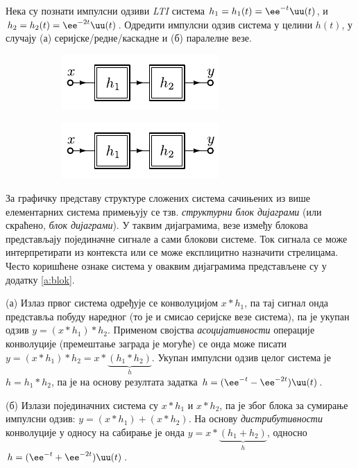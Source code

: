\PID 
Нека су познати импулсни одзиви \textit{LTI} система 
 $h_1 = h_1(t) = \ee^{-t} \uu(t)$, и $h_2 = h_2(t) = \ee^{-2t} \uu(t)$. Одредити 
импулсни одзив система у целини $h(t)$, у случају (а) серијске/редне/каскадне и (б) паралелне везе. 
\begin{figure}[ht!]
    \begin{subfigure}{0.5\textwidth}
        \centering
        \includegraphics[page=1]{fig/ser_par.pdf}
        \caption{}
    \end{subfigure}
    \begin{subfigure}{0.5\textwidth}
        \centering
        \includegraphics[page=2]{fig/ser_par.pdf}
        \caption{}
    \end{subfigure}
    \caption{}
\end{figure}

\RESENJE

За графичку представу структуре сложених система сачињених из више елементарних система примењују се тзв. \textit{структурни блок дијаграми}
(или скраћено, \textit{блок дијаграми}). У таквим дијаграмима, везе између блокова представљају појединачне сигнале а сами блокови системе.
Ток сигнала се може интерпретирати из контекста или се може експлицитно назначити стрелицама. Често коришћене ознаке система у оваквим дијаграмима 
представљене су у додатку \ref{a:blok}.

(а) Излаз првог система одређује се конволуцијом $x \ast h_1$, па тај сигнал онда представља побуду наредног (то је и смисао серијске везе система), 
па је укупан одзив $y = (x \ast h_1) \ast h_2$. Применом својства \textit{асоцијативности} операције конволуције (премештање заграда је 
могуће) се онда може писати 
$y =(x \ast h_1) \ast h_2 = x \ast \underbrace{( h_1 \ast h_2)}_{h}$. Укупан импулсни одзив целог система је
$h = h_1 \ast h_2$, па је на основу резултата задатка  $h = (\ee^{-t} - \ee^{-2t}) \uu(t)$. 

(б) Излази појединачних система су $x \ast h_1$ и $x \ast h_2$, па је због блока за сумирање импулсни одзив: 
$y = (x \ast h_1) + (x \ast h_2)$. На основу \textit{дистрибутивности} конволуције у односу на сабирање је онда 
$y = x \ast \underbrace{(h_1 + h_2)}_h$, односно $h = (\ee^{-t} + \ee^{-2t}) \uu(t)$.

